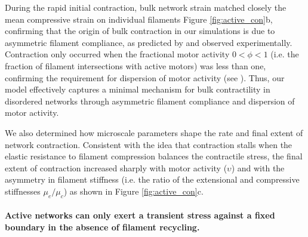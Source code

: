 \documentclass[10pt,letterpaper]{article}
\begin{document}
During the rapid initial contraction, bulk network strain matched closely the mean compressive strain on individual filaments Figure \ref{fig:active_con}b, confirming that the origin of bulk contraction in our simulations is due to asymmetric filament compliance, as predicted by \cite{1367-2630-14-3-033037,PhysRevX.4.041002} and observed experimentally\cite{rheo_2D1}. Contraction only occurred when the fractional motor activity $0<\phi<1$ (i.e. the fraction of filament intersections with active motors) was less than one, confirming the requirement for dispersion of motor activity (see ). Thus, our model effectively captures a minimal mechanism for bulk contractility in disordered networks through asymmetric filament compliance and dispersion of motor activity.

We also determined how microscale parameters shape the rate and final extent of network contraction. Consistent with the idea that contraction stalls when the elastic resistance to filament compression balances the contractile stress, the final extent of contraction increased sharply with motor activity ($\upsilon$) and with the asymmetry in filament stiffness (i.e. the ratio of the extensional and compressive stiffnesses $\mu_e/\mu_c$) as shown in Figure \ref{fig:active_con}c.


\paragraph{Active networks can only exert a transient stress against a fixed boundary in the absence of filament recycling.}
\end{document}
